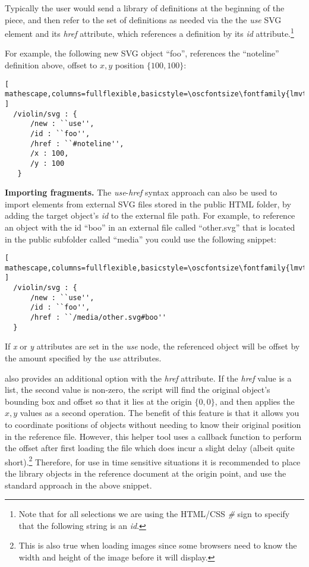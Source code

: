 Typically the user would send a library of definitions at the beginning of the piece, and then refer to the set of definitions as needed via the the \textit{use} SVG element and its \textit{href} attribute, which references a definition by its \textit{id} attribute.\footnote{Note that for all selections we are using the HTML/CSS \textit{\#} sign to specify that the following string is an \textit{id}.}

For example, the following new SVG object ``foo'', references the ``noteline'' definition above, offset to ${x,y}$ position $\{100,100\}$:

\begin{minipage}{\linewidth}
\begin{lstlisting}[ mathescape,columns=fullflexible,basicstyle=\oscfontsize\fontfamily{lmvtt}\selectfont ]
  /violin/svg : {
      /new : ``use'',
      /id : ``foo'',
      /href : ``#noteline'',
      /x : 100,
      /y : 100
   }
 \end{lstlisting}
\end{minipage}

\medskip
\noindent
\textbf{Importing fragments.} 
The \textit{use}-\textit{href} syntax approach can also be used to import elements from external SVG files stored in the public HTML folder, by adding the target object's \textit{id} to the external file path.
For example, to reference an object with the id ``boo'' in an external file called ``other.svg'' that is located in the public subfolder called ``media'' you could use the following snippet:

\begin{lstlisting}[ mathescape,columns=fullflexible,basicstyle=\oscfontsize\fontfamily{lmvtt}\selectfont ]
  /violin/svg : {
      /new : ``use'',
      /id : ``foo'',
      /href : ``/media/other.svg#boo''
  }
 \end{lstlisting}

If \textit{x} or \textit{y} attributes are set in the \textit{use} node, the referenced object will be offset by the amount specified by the  \textit{use} attributes.

\drawsocket also provides an additional option with the \textit{href} attribute. If the \textit{href} value is a list, the second value is non-zero, the script will find the original object's bounding box and offset so that it lies at the origin $\{0,0\}$, and then applies the ${x,y}$ values as a second operation. The benefit of this feature is that it allows you to coordinate positions of objects without needing to know their original position in the reference file. However, this helper tool uses a callback function to perform the offset after first loading the file which does incur a slight delay (albeit quite short).\footnote{This is also true when loading images since some browsers need to know the width and height of the image before it will display.}
Therefore, for use in time sensitive situations it is recommended to place the library objects in the reference document at the origin point, and use the standard approach in the above snippet.

